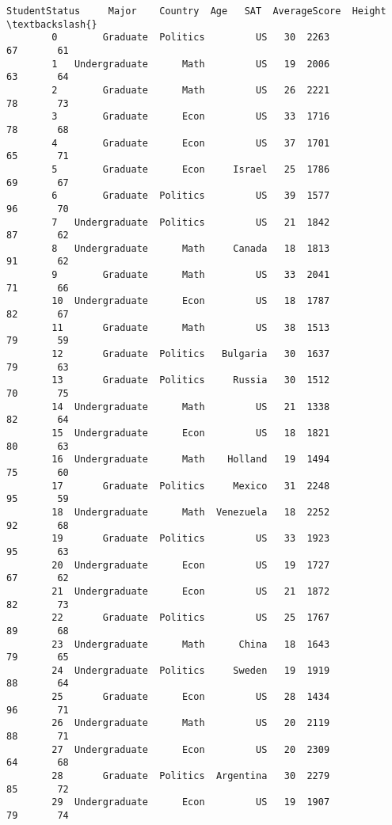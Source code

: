 \documentclass[11pt]{article}
\begin{document}
\begin{Verbatim}[commandchars=\\\{\}]
            StudentStatus     Major    Country  Age   SAT  AverageScore  Height   \textbackslash{}
        0        Graduate  Politics         US   30  2263            67       61   
        1   Undergraduate      Math         US   19  2006            63       64   
        2        Graduate      Math         US   26  2221            78       73   
        3        Graduate      Econ         US   33  1716            78       68   
        4        Graduate      Econ         US   37  1701            65       71   
        5        Graduate      Econ     Israel   25  1786            69       67   
        6        Graduate  Politics         US   39  1577            96       70   
        7   Undergraduate  Politics         US   21  1842            87       62   
        8   Undergraduate      Math     Canada   18  1813            91       62   
        9        Graduate      Math         US   33  2041            71       66   
        10  Undergraduate      Econ         US   18  1787            82       67   
        11       Graduate      Math         US   38  1513            79       59   
        12       Graduate  Politics   Bulgaria   30  1637            79       63   
        13       Graduate  Politics     Russia   30  1512            70       75   
        14  Undergraduate      Math         US   21  1338            82       64   
        15  Undergraduate      Econ         US   18  1821            80       63   
        16  Undergraduate      Math    Holland   19  1494            75       60   
        17       Graduate  Politics     Mexico   31  2248            95       59   
        18  Undergraduate      Math  Venezuela   18  2252            92       68   
        19       Graduate  Politics         US   33  1923            95       63   
        20  Undergraduate      Econ         US   19  1727            67       62   
        21  Undergraduate      Econ         US   21  1872            82       73   
        22       Graduate  Politics         US   25  1767            89       68   
        23  Undergraduate      Math      China   18  1643            79       65   
        24  Undergraduate  Politics     Sweden   19  1919            88       64   
        25       Graduate      Econ         US   28  1434            96       71   
        26  Undergraduate      Math         US   20  2119            88       71   
        27  Undergraduate      Econ         US   20  2309            64       68   
        28       Graduate  Politics  Argentina   30  2279            85       72   
        29  Undergraduate      Econ         US   19  1907            79       74   
        

\end{Verbatim}
\end{document}
